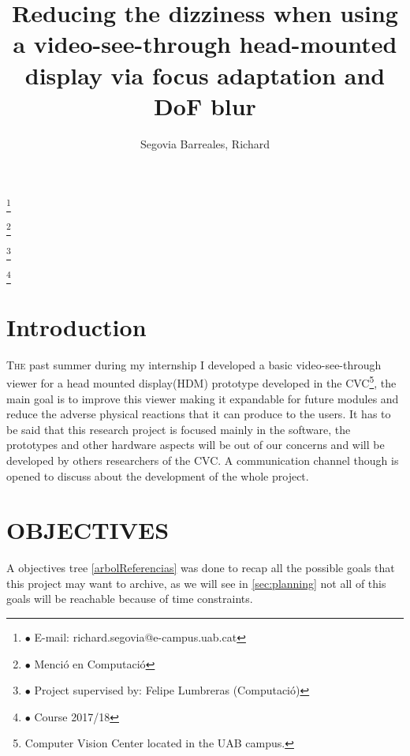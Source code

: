 \documentclass[10pt,a4paper,twocolumn,twoside]{article}
\author{\LARGE\sffamily Segovia Barreales, Richard}
\title{\Huge{\sffamily Reducing the dizziness when using a video-see-through head-mounted display via focus adaptation and DoF blur}}
\date{}
\newcommand\blfootnote[1]{%
  \begingroup
  \renewcommand\thefootnote{}\footnote{#1}%
  \addtocounter{footnote}{-1}%
  \endgroup
}
\begin{document}
\fancyhead[RO]{\thepage}
\fancyhead[LE]{\thepage}

\fancyfoot[CO,CE]{}

{
   \fancyhf{}
}

\renewcommand{\headrulewidth}{0pt}
\renewcommand{\footrulewidth}{0pt}
\pagestyle{fancy}

\maketitle

\thispagestyle{primerapagina}


\blfootnote{$\bullet$ E-mail: richard.segovia@e-campus.uab.cat}
\blfootnote{$\bullet$ Menció en Computació}
\blfootnote{$\bullet$ Project supervised by: Felipe Lumbreras (Computació)}
\blfootnote{$\bullet$ Course 2017/18}


\section{Introduction}

\lettrine[lines=3]{T}{he} past summer during my internship I developed a basic video-see-through viewer for a head mounted display(HDM) prototype developed in the CVC\footnote{Computer Vision Center located in the UAB campus.}, the main goal is to improve this viewer making it expandable for future modules and reduce the adverse physical reactions that it can produce to the users\cite{disconfortReview}. It has to be said that this research project is focused mainly in the software, the prototypes and other hardware aspects will be out of our concerns and will be developed by others researchers of the CVC. A communication channel though is opened to discuss about the development of the whole project.

\section{OBJECTIVES}

A objectives tree \ref{arbolReferencias} was done to recap all the possible goals that this project may want to archive, as we will see in \ref{sec:planning} not all of this goals will be reachable because of time constraints.
\end{document}
